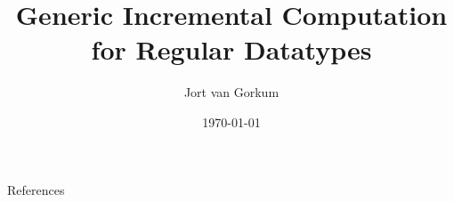 \documentclass[aspectratio=169]{beamer}
\title{\textbf{Generic Incremental Computation for Regular Datatypes}}
\author{Jort van Gorkum}
\institute{Utrecht University}
\date{\today}
\begin{document}
\begin{frame}
\titlepage
\end{frame}

% 

% 

% 

% 

% 

% 

% 

% 

% 

\begin{frame}{References}
\printbibliography
\end{frame}
\end{document}
